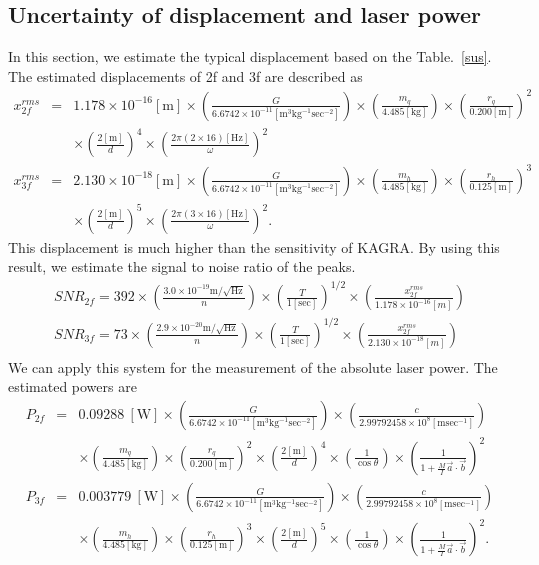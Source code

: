 \documentclass[A4]{spie}  %
\begin{document}
\subsection{Uncertainty of displacement and  laser power}
In this section, we estimate the typical displacement based on the Table.~\ref{sus}. 
 The estimated displacements of 2f and 3f are described as
\begin{eqnarray}
x^{rms}_{2f}&=&1.178 \times 10^{-16}\mathrm{[m]} \times \left( \frac{G}{6.6742 \times 10^{-11} \mathrm{[m^3kg^{-1}sec^{-2}]}} \right) \times \left( \frac{m_q}{4.485 \mathrm{[kg]}} \right) \times \left( \frac{r_q}{0.200 \mathrm{[m]}} \right)^2 \nonumber \\
 &&\times \left( \frac{2\mathrm{[m]}}{d} \right)^4 \times \left( \frac{2\pi(2\times 16)\mathrm{[Hz]}}{\omega} \right)^2\\
x^{rms}_{3f}&=&2.130 \times 10^{-18}\mathrm{[m]} \times \left( \frac{G}{6.6742 \times 10^{-11} \mathrm{[m^3kg^{-1}sec^{-2}]}} \right) \times \left( \frac{m_h}{4.485 \mathrm{[kg]}} \right) \times \left( \frac{r_h}{0.125 \mathrm{[m]}} \right)^3 \nonumber \\
 &&\times \left( \frac{2\mathrm{[m]}}{d} \right)^5 \times \left( \frac{2\pi(3\times 16)\mathrm{[Hz]}}{\omega} \right)^2.
\end{eqnarray}
This displacement is much higher than the sensitivity of KAGRA. 
By using this result, we estimate the signal to noise ratio of the peaks.
\begin{eqnarray}
SNR_{2f}=392 \times \left(\frac{3.0 \times 10^{-19} \mathrm{m/\sqrt{Hz}}}{n} \right) \times \left(\frac{T}{1 [\mathrm{sec}]} \right)^{1/2} \times \left(\frac{x_{2f}^{rms}}{1.178 \times 10^{-16}[m] }  \right)   \\
SNR_{3f}=73 \times \left(\frac{2.9 \times 10^{-20} \mathrm{m/\sqrt{Hz}}}{n} \right) \times \left(\frac{T}{1 [\mathrm{sec}]} \right)^{1/2} \times \left(\frac{x_{2f}^{rms}}{2.130 \times 10^{-18}[m] } \right)   \\
\end{eqnarray}
We can apply this system for the measurement of the absolute laser power. The estimated powers are
\begin{eqnarray}
P_{2f}&=&0.09288 ~\mathrm{[W]}\times \left( \frac{G}{6.6742 \times 10^{-11} \mathrm{[m^3kg^{-1}sec^{-2}]}} \right)\times \left( \frac{c}{2.99792458 \times 10^{8} \mathrm{[m sec^{-1}]}} \right) \nonumber \\
&& \times \left( \frac{m_q}{4.485 \mathrm{[kg]}} \right) \times \left( \frac{r_q}{0.200 \mathrm{[m]}} \right)^2 \times \left( \frac{2\mathrm{[m]}}{d} \right)^4 \times \left( \frac{1}{\cos{\theta}} \right) \times \left( \frac{1}{1+\frac{M}{I}\vec{a}\cdot \vec{b}} \right)^2\\
P_{3f}&=&0.003779~\mathrm{[W]} \times \left( \frac{G}{6.6742 \times 10^{-11} \mathrm{[m^3kg^{-1}sec^{-2}]}} \right)\times \left( \frac{c}{2.99792458 \times 10^{8} \mathrm{[m sec^{-1}]}} \right) \nonumber \\
&& \times \left( \frac{m_h}{4.485 \mathrm{[kg]}} \right) \times \left( \frac{r_h}{0.125 \mathrm{[m]}} \right)^3 \times \left( \frac{2\mathrm{[m]}}{d} \right)^5 \times \left( \frac{1}{\cos{\theta}} \right) \times \left( \frac{1}{1+\frac{M}{I}\vec{a}\cdot \vec{b}} \right)^2.
\end{eqnarray}
\end{document}
